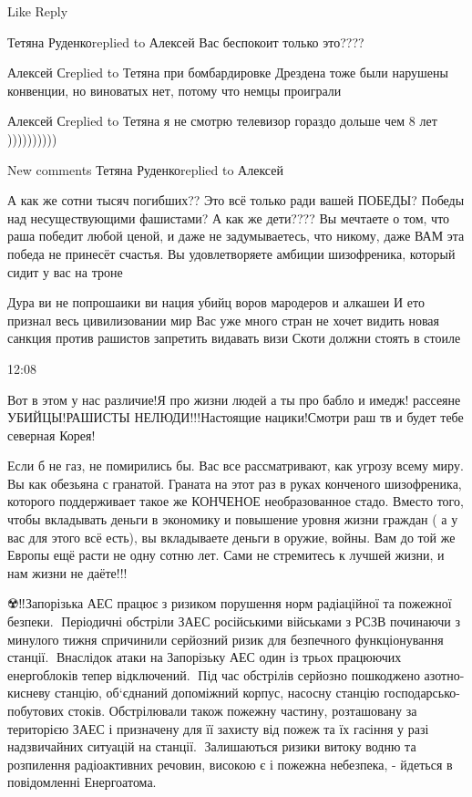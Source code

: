 {    Like
    Reply

Тетяна Руденкоreplied to Алексей
Вас беспокоит только это????

Алексей Сreplied to Тетяна
при бомбардировке Дрездена тоже были нарушены конвенции, но виноватых нет, потому что немцы проиграли

Алексей Сreplied to Тетяна
я не смотрю телевизор гораздо дольше чем 8 лет ))))))))))

New comments
Тетяна Руденкоreplied to Алексей

А как же сотни тысяч погибших?? Это всё только ради вашей ПОБЕДЫ? Победы над
несуществующими фашистами? А как же дети???? Вы мечтаете о том, что раша
победит любой ценой, и даже не задумываетесь, что никому, даже ВАМ эта победа
не принесёт счастья. Вы удовлетворяете амбиции шизофреника, который сидит у вас
на троне


Дура ви не попрошаики ви нация убийц воров мародеров и алкашеи И ето признал
весь цивилизовании мир Вас уже много стран не хочет видить новая санкция против
рашистов запретить видавать визи Скоти должни стоять в стоиле

12:08

Вот в этом у нас различие!Я про жизни людей а ты про бабло и имедж! рассеяне
УБИЙЦЫ!РАШИСТЫ НЕЛЮДИ!!!Настоящие нацики!Смотри раш тв и будет тебе северная
Корея!


Если б не газ, не помирились бы. Вас все рассматривают, как угрозу всему миру.
Вы как обезьяна с гранатой. Граната на этот раз в руках конченого шизофреника,
которого поддерживает такое же КОНЧЕНОЕ необразованное стадо. Вместо того,
чтобы вкладывать деньги в экономику и повышение уровня жизни граждан ( а у вас
для этого всё есть), вы вкладываете деньги в оружие, войны. Вам до той же
Европы ещё расти не одну сотню лет. Сами не стремитесь к лучшей жизни, и нам
жизни не даёте!!!


☢️‼️Запорізька АЕС працює з ризиком порушення норм радіаційної та пожежної безпеки.
🔻Періодичні обстріли ЗАЕС російськими військами з РСЗВ починаючи з минулого тижня спричинили серйозний ризик для безпечного функціонування станції.
🔻Внаслідок атаки на Запорізьку АЕС один із трьох працюючих енергоблоків тепер відключений.
🔻Під час обстрілів серйозно пошкоджено азотно-кисневу станцію, об‘єднаний допоміжний корпус, насосну станцію господарсько-побутових стоків. Обстрілювали також пожежну частину, розташовану за територією ЗАЕС і призначену для її захисту від пожеж та їх гасіння у разі надзвичайних ситуацій на станції.
🔻Залишаються ризики витоку водню та розпилення радіоактивних речовин, високою є і пожежна небезпека, - йдеться в повідомленні Енергоатома.

}
